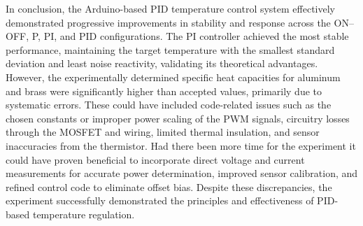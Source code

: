 In conclusion, the Arduino-based PID temperature control system effectively
demonstrated progressive improvements in stability and response across the
ON--OFF, P, PI, and PID configurations.
The PI controller achieved the most stable performance, maintaining the target
temperature with the smallest standard deviation and least noise reactivity,
validating its theoretical advantages.
However, the experimentally determined specific heat capacities for aluminum
and brass were significantly higher than accepted values, primarily due to
systematic errors.
These could have included code-related issues such as the chosen constants or
improper power scaling of the PWM signals, circuitry losses through the MOSFET
and wiring, limited thermal insulation, and sensor inaccuracies from the
thermistor.
Had there been more time for the experiment it could have proven beneficial to
incorporate direct voltage and current measurements for accurate power
determination, improved sensor calibration, and refined control code to
eliminate offset bias.
Despite these discrepancies, the experiment successfully demonstrated the
principles and effectiveness of PID-based temperature regulation.